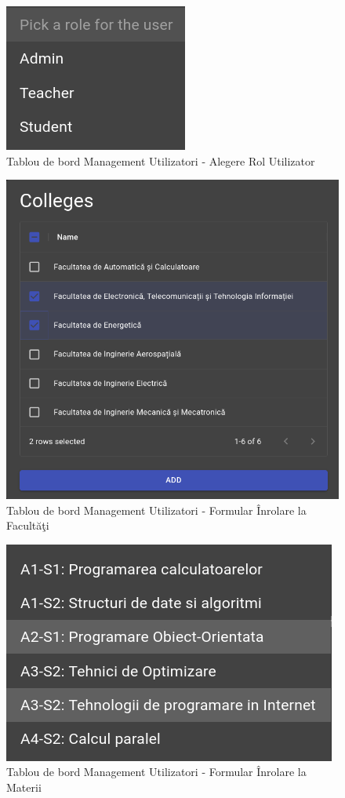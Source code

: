 \documentclass[12pt, a4paper, oneside, romanian]{teza-upb}
\begin{document}
\begin{figure}[H]
\centering
\includegraphics*[width=0.3\columnwidth]{tablou-de-bord-management-utilizatori-alegere-rol-utilizator}
\caption{Tablou de bord Management Utilizatori - Alegere Rol Utilizator}
\label{tablou-de-bord-management-utilizatori-alegere-rol-utilizator}
\end{figure}

\begin{figure}[H]
\centering
\includegraphics*[width=0.75\columnwidth]{tablou-de-bord-management-utilizatori-formular-inrolare-la-facultati}
\caption{Tablou de bord Management Utilizatori - Formular Înrolare la Facultăţi}
\label{tablou-de-bord-management-utilizatori-formular-inrolare-la-facultati}
\end{figure}

\begin{figure}[H]
\centering
\includegraphics*[width=0.6\columnwidth]{tablou-de-bord-management-utilizatori-formular-inrolare-la-materii}
\caption{Tablou de bord Management Utilizatori - Formular Înrolare la Materii}
\label{tablou-de-bord-management-utilizatori-formular-inrolare-la-materii}
\end{figure}
\end{document}
